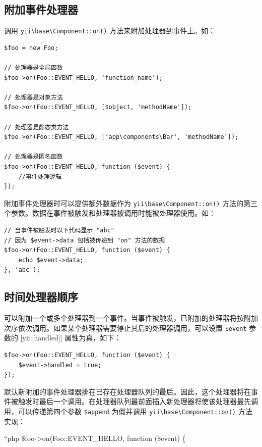 \subsection{附加事件处理器}
调用 \texttt{yii{\allowbreak{}\textbackslash}base{\allowbreak{}\textbackslash}Component\allowbreak{}::\allowbreak{}on()} 方法来附加处理器到事件上。如：

\lstset{language=php}\begin{lstlisting}
$foo = new Foo;

// 处理器是全局函数
$foo->on(Foo::EVENT_HELLO, 'function_name');

// 处理器是对象方法
$foo->on(Foo::EVENT_HELLO, [$object, 'methodName']);

// 处理器是静态类方法
$foo->on(Foo::EVENT_HELLO, ['app\components\Bar', 'methodName']);

// 处理器是匿名函数
$foo->on(Foo::EVENT_HELLO, function ($event) {
    //事件处理逻辑
});
\end{lstlisting}
附加事件处理器时可以提供额外数据作为 \texttt{yii{\allowbreak{}\textbackslash}base{\allowbreak{}\textbackslash}Component\allowbreak{}::\allowbreak{}on()} 方法的第三个参数。数据在事件被触发和处理器被调用时能被处理器使用。如：

\lstset{language=php}\begin{lstlisting}
// 当事件被触发时以下代码显示 "abc"
// 因为 $event->data 包括被传递到 "on" 方法的数据
$foo->on(Foo::EVENT_HELLO, function ($event) {
    echo $event->data;
}, 'abc');
\end{lstlisting}
\subsection{时间处理器顺序}
可以附加一个或多个处理器到一个事件。当事件被触发，已附加的处理器将按附加次序依次调用。如果某个处理器需要停止其后的处理器调用，可以设置 \lstinline|$event| 参数的 [yii\base\Event::handled]] 属性为真，如下：

\lstset{language=php}\begin{lstlisting}
$foo->on(Foo::EVENT_HELLO, function ($event) {
    $event->handled = true;
});
\end{lstlisting}
默认新附加的事件处理器排在已存在处理器队列的最后。因此，这个处理器将在事件被触发时最后一个调用。在处理器队列最前面插入新处理器将使该处理器最先调用，可以传递第四个参数 \lstinline|$append| 为假并调用 \texttt{yii{\allowbreak{}\textbackslash}base{\allowbreak{}\textbackslash}Component\allowbreak{}::\allowbreak{}on()} 方法实现：

``php
\$foo->on(Foo::EVENT\_HELLO, function (\$event) \{

